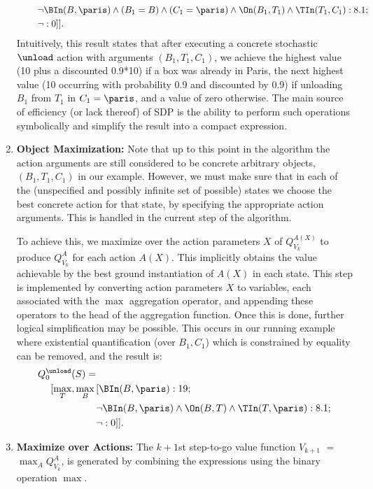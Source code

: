 \begin{enumerate}
\begin{align*}
  & \qquad \, \neg \BIn(B,\paris) \land (B_1=B)\land (C_1=\paris)  \land \On(B_1,T_1) \land \TIn(T_1,C_1): 8.1; \\
  & \qquad \, \neg: 0]].
  \end{align*}
  Intuitively, this result states that after executing a concrete stochastic $\unload$
  action with arguments $(B_1,T_1,C_1)$, we achieve the highest value (10 plus a discounted 0.9*10) if a box was already in Paris,
  the next highest value (10 occurring with probability 0.9 and discounted by 0.9) if unloading $B_1$ from $T_1$ in $C_1=\paris$, and a
  value of zero otherwise. 
  The main source of efficiency (or lack thereof) of SDP is the ability to perform such operations symbolically and simplify the result into a compact expression.
  
 
\item \label{sdp_3} {\bf Object Maximization:} 
Note that up to this point in the algorithm the action arguments are still considered to be concrete arbitrary objects,
$(B_1,T_1,C_1)$ in our example. 
However, we must make sure that in each of the (unspecified and possibly infinite set of possible) states we choose the best concrete action for that state, by specifying the appropriate action arguments. This is handled in the current step of the algorithm.


To achieve this, we maximize over the
  action parameters $X$ of $Q_{V_k}^{A(X)}$ to produce $Q_{V_k}^A$ for each
  action $A(X)$. This implicitly obtains the value achievable by the best
  ground instantiation of $A(X)$ in each state. This step is
  implemented by converting action parameters $X$ 
  to variables, each associated with the $\max$ aggregation operator,
  and appending these operators to the head of the aggregation
  function. Once this is done, further logical simplification may be possible. This occurs in our running example where existential quantification (over $B_1,C_1$) which is constrained by equality can be removed, and the result is:
\begin{align*}
Q_0^{\unload}(S) = & \\
[\max_T, \max_B \, & [\BIn(B,\paris):19;  \\
    & \neg \BIn(B,\paris) \land \On(B,T) \land \TIn(T,\paris): 8.1; \\
    & \neg: 0]].
\end{align*}

%
%
%
%
%
%
%
%

\item \label{sdp_4} {\bf Maximize over Actions:} The $k\!+\!1$st step-to-go
  value function $V_{k+1}$ $=$ $\max_A Q_{V_k}^A$, is generated by
  combining the expressions using the binary operation $\max$.
  

\end{enumerate}
